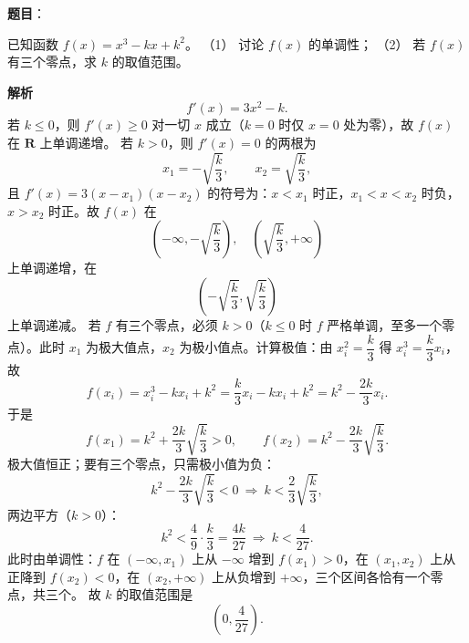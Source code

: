 \begin{answer}

\textbf{题目}：

已知函数 $f(x)=x^3-kx+k^2$。
（1） 讨论 $f(x)$ 的单调性；
（2） 若 $f(x)$ 有三个零点，求 $k$ 的取值范围。

\textbf{解析}
\nopagebreak[4]
\[f'(x)=3x^2-k .\]
若 $k\leqslant0$，则 $f'(x)\geqslant0$ 对一切 $x$ 成立（$k=0$ 时仅 $x=0$ 处为零），故 $f(x)$ 在 $\mathbf R$ 上单调递增。
若 $k>0$，则 $f'(x)=0$ 的两根为
\nopagebreak[4]
\[x_1=-\sqrt{\frac k3},\qquad x_2=\sqrt{\frac k3},\]
且 $f'(x)=3(x-x_1)(x-x_2)$ 的符号为：$x<x_1$ 时正，$x_1<x<x_2$ 时负，$x>x_2$ 时正。故 $f(x)$ 在
\nopagebreak[4]
\[\left(-\infty,-\sqrt{\frac k3}\right),\quad \left(\sqrt{\frac k3},+\infty\right)\]
上单调递增，在
\nopagebreak[4]
\[\left(-\sqrt{\frac k3},\sqrt{\frac k3}\right)\]
上单调递减。
若 $f$ 有三个零点，必须 $k>0$（$k\leqslant0$ 时 $f$ 严格单调，至多一个零点）。此时 $x_1$ 为极大值点，$x_2$ 为极小值点。计算极值：由 $x_i^2=\dfrac k3$ 得 $x_i^3=\dfrac k3x_i$，故
\nopagebreak[4]
\[f(x_i)=x_i^3-kx_i+k^2=\frac k3x_i-kx_i+k^2=k^2-\frac{2k}3x_i .\]
于是
\nopagebreak[4]
\[f(x_1)=k^2+\frac{2k}3\sqrt{\frac k3}>0,\qquad f(x_2)=k^2-\frac{2k}3\sqrt{\frac k3} .\]
极大值恒正；要有三个零点，只需极小值为负：
\nopagebreak[4]
\[k^2-\frac{2k}3\sqrt{\frac k3}<0\ \Longrightarrow\ k<\frac23\sqrt{\frac k3},\]
两边平方（$k>0$）：
\nopagebreak[4]
\[k^2<\frac49\cdot\frac k3=\frac{4k}{27}\ \Longrightarrow\ k<\frac4{27} .\]
此时由单调性：$f$ 在 $\left(-\infty,x_1\right)$ 上从 $-\infty$ 增到 $f(x_1)>0$，在 $(x_1,x_2)$ 上从正降到 $f(x_2)<0$，在 $(x_2,+\infty)$ 上从负增到 $+\infty$，三个区间各恰有一个零点，共三个。
故 $k$ 的取值范围是
\nopagebreak[4]
\[\left(0,\frac4{27}\right).\]



\end{answer}
